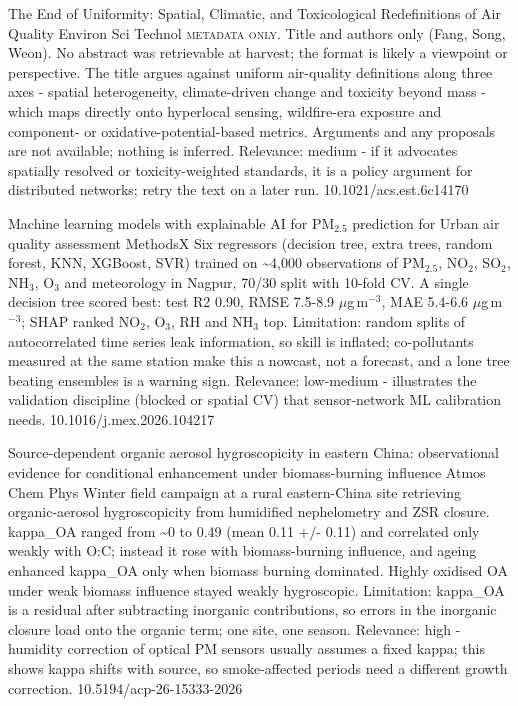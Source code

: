 \documentclass[10pt]{article}
\begin{document}
{The End of Uniformity: Spatial, Climatic, and Toxicological Redefinitions of Air Quality}
{Environ Sci Technol}
{\textsc{metadata only.} Title and authors only (Fang, Song, Weon). No abstract was retrievable at harvest; the format is likely a viewpoint or perspective. The title argues against uniform air-quality definitions along three axes - spatial heterogeneity, climate-driven change and toxicity beyond mass - which maps directly onto hyperlocal sensing, wildfire-era exposure and component- or oxidative-potential-based metrics. Arguments and any proposals are not available; nothing is inferred. Relevance: medium - if it advocates spatially resolved or toxicity-weighted standards, it is a policy argument for distributed networks; retry the text on a later run.}
{10.1021/acs.est.6c14170}

\par{}\baselineskip{}\baselineskip
{}

{Machine learning models with explainable AI for PM$_{2.5}$ prediction for Urban air quality assessment}
{MethodsX}
{Six regressors (decision tree, extra trees, random forest, KNN, XGBoost, SVR) trained on \textasciitilde{}4,000 observations of PM$_{2.5}$, NO$_2$, SO$_2$, NH$_3$, O$_3$ and meteorology in Nagpur, 70/30 split with 10-fold CV. A single decision tree scored best: test R2 0.90, RMSE 7.5-8.9 $\mu$g\,m$^{-3}$, MAE 5.4-6.6 $\mu$g\,m$^{-3}$; SHAP ranked NO$_2$, O$_3$, RH and NH$_3$ top. Limitation: random splits of autocorrelated time series leak information, so skill is inflated; co-pollutants measured at the same station make this a nowcast, not a forecast, and a lone tree beating ensembles is a warning sign. Relevance: low-medium - illustrates the validation discipline (blocked or spatial CV) that sensor-network ML calibration needs.}
{10.1016/j.mex.2026.104217}

{Source-dependent organic aerosol hygroscopicity in eastern China: observational evidence for conditional enhancement under biomass-burning influence}
{Atmos Chem Phys}
{Winter field campaign at a rural eastern-China site retrieving organic-aerosol hygroscopicity from humidified nephelometry and ZSR closure. kappa\_OA ranged from \textasciitilde{}0 to 0.49 (mean 0.11 +/- 0.11) and correlated only weakly with O:C; instead it rose with biomass-burning influence, and ageing enhanced kappa\_OA only when biomass burning dominated. Highly oxidised OA under weak biomass influence stayed weakly hygroscopic. Limitation: kappa\_OA is a residual after subtracting inorganic contributions, so errors in the inorganic closure load onto the organic term; one site, one season. Relevance: high - humidity correction of optical PM sensors usually assumes a fixed kappa; this shows kappa shifts with source, so smoke-affected periods need a different growth correction.}
{10.5194/acp-26-15333-2026}
\end{document}
